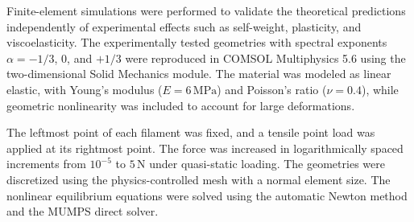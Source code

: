 \documentclass[pdflatex, twocolumn, sn-nature]{sn-jnl}
\begin{document}
Finite-element simulations were performed to validate the theoretical predictions independently of experimental effects such as self-weight, plasticity, and viscoelasticity. The experimentally tested geometries with spectral exponents $\alpha=-1/3$, $0$, and $+1/3$ were reproduced in COMSOL Multiphysics 5.6 using the two-dimensional Solid Mechanics module. The material was modeled as linear elastic, with Young’s modulus ($E=6\,\mathrm{MPa}$) and Poisson’s ratio ($\nu=0.4$), while geometric nonlinearity was included to account for large deformations.

The leftmost point of each filament was fixed, and a tensile point load was applied at its rightmost point. The force was increased in logarithmically spaced increments from $10^{-5}$ to $5\,\mathrm{N}$ under quasi-static loading. The geometries were discretized using the physics-controlled mesh with a normal element size. The nonlinear equilibrium equations were solved using the automatic Newton method and the MUMPS direct solver.



\end{document}
